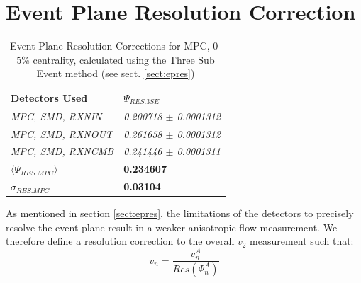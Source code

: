 \section{Event Plane Resolution Correction}
\label{secteperr}
\begin{table}[htbp!]
\centering
\caption[Event Plane Resolution Corrections for MPC, 0-5\% centrality]{Event Plane Resolution Corrections for MPC, 0-5\% centrality, calculated using the Three Sub Event method (see sect. \ref{sect:epres})}
\label{EPrestable}
\begin{tabular}{|l|l|}
\hline
\textbf{Detectors Used}     & \textbf{$\Psi_{RES.3SE}$}       \\ \hline
\textit{MPC, SMD, RXNIN}    & \textit{0.200718 $\pm$ 0.0001312} \\ \hline
\textit{MPC, SMD, RXNOUT}   & \textit{0.261658 $\pm$ 0.0001312} \\ \hline
\textit{MPC, SMD, RXNCMB}   & \textit{0.241446 $\pm$ 0.0001311} \\ \hline
\textbf{$\langle\Psi_{RES.MPC}\rangle$}            & \textbf{0.234607}               \\ \hline
\textbf{$\sigma_{RES.MPC}$} & \textbf{0.03104}                \\ \hline
\end{tabular}
\end{table}
As mentioned in section \ref{sect:epres}, the limitations of the detectors to precisely resolve the event plane result in a weaker anisotropic flow measurement. We therefore define a resolution correction to the overall $v_2$ measurement such that:
\begin{equation}
v_n = \frac{v_n^{A}}{Res(\Psi_n^A)}
\end{equation}
